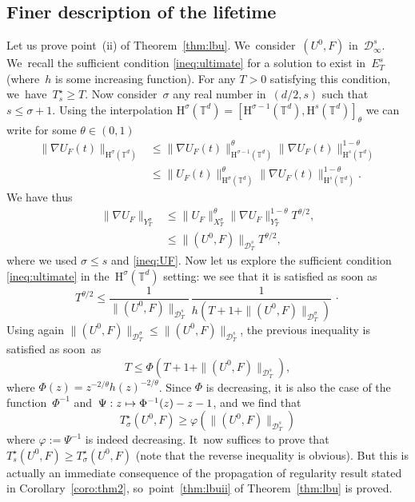 \documentclass[10pt]{amsart}
\newcommand\mto{\mathchoice{\longmapsto}{\mapsto}{\mapsto}{\mapsto}}
\theoremstyle{definition}
\newcommand\T{\mathbb{T}}
\renewcommand\H{\mathrm{H}}
\let\ffi\varphi
\begin{document}
\subsection{Finer description of the lifetime}
Let us prove point~(ii) of Theorem~\ref{thm:lbu}. We~consider~$(U^0,F)$ in~$\mathcal D_\infty^{s}$. We~recall the sufficient condition \eqref{ineq:ultimate} for a solution to
exist in~$E_T^s$
(where~$h$ is some increasing function). For any $T>0$ satisfying this condition, we~have~$T_s^\star \geq T$.
Now consider~$\sigma $ any real number in~$ (d/2,s)$ such that \hbox{$s \leq \sigma+1$}. Using the interpolation $\H^\sigma(\T^d) = [\H^{\sigma-1}(\T^d),\H^s(\T^d)]_\theta$ we can write for some $\theta\in(0,1)$
\begin{align*}
\|\nabla U_F(t)\|_{\H^{\sigma}(\T^d)} &\leq \|\nabla U_F(t)\|_{\H^{\sigma-1}(\T^d)}^\theta \|\nabla U_F(t)\|_{\H^s(\T^d)}^{1-\theta}\\
&\leq \|U_F(t)\|_{\H^{\sigma}(\T^d)}^\theta \|\nabla U_F(t)\|_{\H^s(\T^d)}^{1-\theta}.
\end{align*}
We have thus
\begin{align*}
\|\nabla U_F\|_{Y_T^\sigma} &\leq \|U_F\|_{X_T^\sigma}^\theta \|\nabla U_F\|_{Y_T^s}^{1-\theta} T^{\theta/2},\\
&\leq \| (U^0,F)\| _{\mathcal D_T^{s}} T^{\theta/2},
\end{align*}
where we used $\sigma\leq s$ and \eqref{ineq:UF}. Now let us explore the sufficient condition \eqref{ineq:ultimate} in the~$\H^\sigma(\T^d)$ setting: we see that it is satisfied as soon as
\[
T^{\theta/2} \leq \frac{1}{ \| (U^0,F)\| _{\mathcal D_T^{s}}}\,\frac{1}{h(T+1+ \| (U^0,F)\| _{\mathcal D_T^{\sigma}})} \, \cdotp
\]
Using again $ \| (U^0,F)\| _{\mathcal D_T^{\sigma}}\!\leq\! \| (U^0,F)\| _{\mathcal D_T^{s}}$, the previous inequality is satisfied as soon~as\vspace*{-3pt}
\[
T \leq \Phi(T+1+ \| (U^0,F)\| _{\mathcal D_T^{s}}),
\]
where $\Phi(z)=z^{-2/\theta}h(z)^{-2/\theta}$. Since $\Phi$ is decreasing, it is also the case of the function~$\Phi^{-1}$ and~$\Psi:z\mto \Phi^{-1}(z)-z-1$, and we find that\vspace*{-3pt}\enlargethispage{.5\baselineskip}
\[
T_\sigma^\star (U^0,F)\geq \varphi (\| (U^0,F)\| _{\mathcal D_T^{s}})
\]
where $\ffi:=\Psi^{-1}$ is indeed decreasing. It~now suffices to prove that~$T_s^\star (U^0,F)\geq T_\sigma^\star (U^0,F)$ (note that the reverse inequality is obvious). But this is actually an immediate consequence
of the propagation of regularity result stated in Corollary~\ref{coro:thm2}, so~point~\eqref{thm:lbuii} of Theorem~\ref{thm:lbu} is proved.
\end{document}
